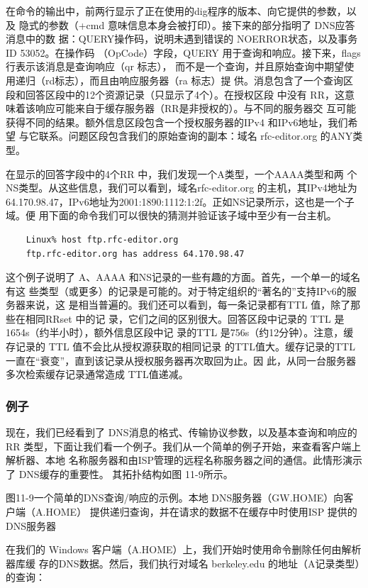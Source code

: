 在命令的输出中，前两行显示了正在使用的dig程序的版本、向它提供的参数，以及
隐式的参数（+cmd 意味信息本身会被打印）。接下来的部分指明了 DNS应答消息中的数
据：QUERY操作码，说明未遇到错误的 NOERROR状态，以及事务 ID 53052。在操作码
（OpCode）字段，QUERY 用于查询和响应。接下来，flags 行表示该消息是查询响应（qr 标志），
而不是一个查询，并且原始查询中期望使用递归（rd标志），而且由响应服务器（ra 标志）提
供。消息包含了一个查询区段和回答区段中的12个资源记录（只显示了4个）。在授权区段
中没有 RR，这意味着该响应可能来自于缓存服务器（RR是非授权的）。与不同的服务器交
互可能获得不同的结果。额外信息区段包含一个授权服务器的IPv4 和IPv6地址，我们希望
与它联系。问题区段包含我们的原始查询的副本：域名 rfc-editor.org 的ANY类型。

在显示的回答字段中的4个RR 中，我们发现一个A类型，一个AAAA类型和两
个NS类型。从这些信息，我们可以看到，域名rfc-editor.org 的主机，其IPv4地址为
64.170.98.47，IPv6地址为2001:1890:1112:1:2f。正如NS记录所示，这也是一个子域。便
用下面的命令我们可以很快的猜测并验证该子域中至少有一台主机。

\begin{verbatim}
    Linux% host ftp.rfc-editor.org
    ftp.rfc-editor.org has address 64.170.98.47
\end{verbatim}

这个例子说明了 A、AAAA 和NS记录的一些有趣的方面。首先，一个单一的域名有这
些类型（或更多）的记录是可能的。对于特定组织的“著名的”支持IPv6的服务器来说，这
是相当普遍的。我们还可以看到，每一条记录都有TTL 值，除了那些在相同RRset 中的记
录，它们之间的区别很大。回答区段中记录的 TTL 是1654s（约半小时），额外信息区段中记
录的TTL 是756s（约12分钟）。注意，缓存记录的 TTL 值不会比从授权源获取的相同记录
的TTL值大。缓存记录的TTL 一直在“衰变”，直到该记录从授权服务器再次取回为止。因
此，从同一台服务器多次检索缓存记录通常造成 TTL值递减。

\subsubsection{例子}

现在，我们已经看到了 DNS消息的格式、传输协议参数，以及基本查询和响应的RR
类型，下面让我们看一个例子。我们从一个简单的例子开始，来查看客户端上解析器、本地
名称服务器和由ISP管理的远程名称服务器之间的通信。此情形演示了 DNS缓存的重要性。
其拓扑结构如图 11-9所示。

图11-9一个简单的DNS查询/响应的示例。本地 DNS服务器（GW.HOME）向客户端（A.HOME）
提供递归查询，并在请求的数据不在缓存中时使用ISP 提供的 DNS服务器

在我们的 Windows 客户端（A.HOME）上，我们开始时使用命令删除任何由解析器库缓
存的DNS数据。然后，我们执行对域名 berkeley.edu 的地址（A记录类型）的查询：

